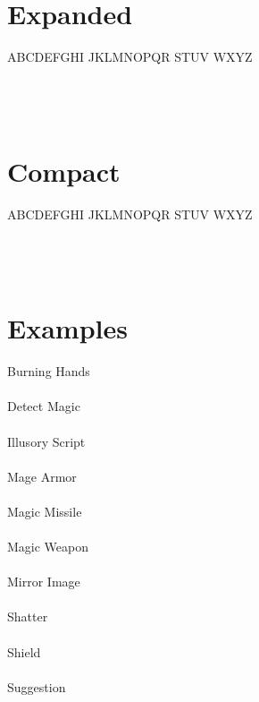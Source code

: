 \documentclass[letterpaper]{article}
\begin{document}
\section*{Expanded}

{
    \Large \wizpenfont \noindent \lsstyle
    ABCDEFGHI \enspace JKLMNOPQR \enspace STUV \enspace WXYZ \\ \\
}
{
    \Large \noindent
     \\ \\
}

\section*{Compact}

{
    \Large \wizpenfont \noindent
    ABCDEFGHI \enspace JKLMNOPQR \enspace STUV \enspace WXYZ \\ \\
}
{
    \Large \noindent
     \\ \\
}

\section*{Examples}

{
    \Large \wizpenfont \noindent %
    Burning \enspace Hands \\ \\
    Detect \enspace Magic \\ \\
    Illusory \enspace Script \\ \\
    Mage \enspace Armor \\ \\
    Magic \enspace Missile \\ \\
    Magic \enspace Weapon \\ \\
    Mirror \enspace Image \\ \\
    Shatter \\ \\
    Shield \\ \\
    Suggestion \\
}
\end{document}

